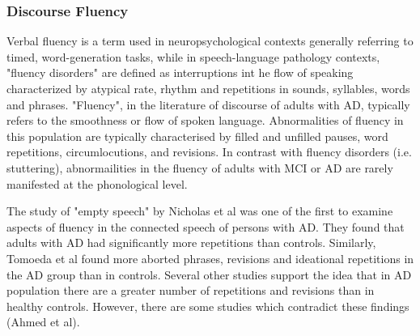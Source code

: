 \documentclass{article}
\begin{document}
\subsubsection{Discourse Fluency}
Verbal fluency is a term used in neuropsychological contexts generally referring to timed, word-generation tasks, while in speech-language pathology contexts, "fluency disorders" are defined as interruptions int he flow of speaking characterized by atypical rate, rhythm and repetitions in sounds, syllables, words and phrases. "Fluency", in the literature of discourse of adults with AD, typically refers to the smoothness or flow of spoken language. Abnormalities of fluency in this population are typically characterised by filled and unfilled pauses, word repetitions, circumlocutions, and revisions. In contrast with fluency disorders (i.e. stuttering), abnormailities in the fluency of adults with MCI or AD are rarely manifested at the phonological level. \newline
\par
The study of "empty speech" by Nicholas et al was one of the first to examine aspects of fluency in the connected speech of persons with AD. They found that adults with AD had significantly more repetitions than controls. Similarly, Tomoeda et al found more aborted phrases, revisions and ideational repetitions in the AD group than in controls. Several other studies support the idea that in AD population there are a greater number of repetitions and revisions than in healthy controls. However, there are some studies which contradict these findings (Ahmed et al). \newline
\par
\end{document}
